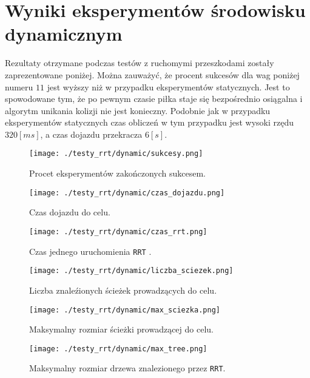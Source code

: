\section{Wyniki eksperymentów środowisku dynamicznym}
Rezultaty otrzymane podczas testów z ruchomymi przeszkodami zostały zaprezentowane poniżej. Można zauważyć, że procent sukcesów dla wag poniżej numeru $11$ jest wyższy niż
w przypadku eksperymentów statycznych. Jest to spowodowane tym, że po pewnym czasie piłka staje się bezpośrednio osiągalna i algorytm unikania kolizji nie jest konieczny.
Podobnie jak w przypadku eksperymentów statycznych czas obliczeń w tym przypadku jest wysoki rzędu $320[ms]$, a czas dojazdu przekracza $6[s]$.
\begin{figure}[h]
\centering
\texttt{[image: ./testy\_rrt/dynamic/sukcesy.png]}
\caption{ Procet eksperymentów zakończonych sukcesem.} \label{fig:dyn_sukcesy}
\end{figure} 
\begin{figure}[h]
\centering
\texttt{[image: ./testy\_rrt/dynamic/czas\_dojazdu.png]}
\caption{ Czas dojazdu do celu.} \label{fig:dyn_czas_dojazdu}
\end{figure} 
\begin{figure}[h]
\centering
\texttt{[image: ./testy\_rrt/dynamic/czas\_rrt.png]}
\caption{ Czas jednego uruchomienia \texttt{RRT} .} \label{fig:dyn_czas_rrt}
\end{figure} 
\begin{figure}[h]
\centering
\texttt{[image: ./testy\_rrt/dynamic/liczba\_sciezek.png]}
\caption{ Liczba znaleźionych ścieżek prowadzących do celu.} \label{fig:dyn_liczba_sciezek}
\end{figure} 
\begin{figure}[h]
\centering
\texttt{[image: ./testy\_rrt/dynamic/max\_sciezka.png]}
\caption{ Maksymalny rozmiar ścieżki prowadzącej do celu.} \label{fig:dyn_max_sciezka}
\end{figure} 
\begin{figure}[h]
\centering
\texttt{[image: ./testy\_rrt/dynamic/max\_tree.png]}
\caption{ Maksymalny rozmiar drzewa znalezionego przez \texttt{RRT}.} \label{fig:dyn_max_tree}
\end{figure} 

